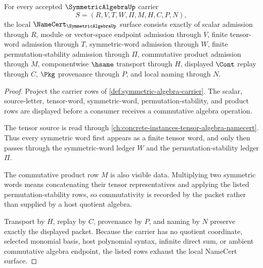 \begin{theorem}
\label{thm:symmetric-algebra-namecert-obligations}
For every accepted $\SymmetricAlgebraUp$ carrier
$$
S=(R,V,T,W,\Pi,M,H,C,P,N),
$$
the local $\NameCert_{\SymmetricAlgebraUp}$ surface consists exactly of scalar admission through $R$, module or vector-space endpoint admission through $V$, finite tensor-word admission through $T$, symmetric-word admission through $W$, finite permutation-stability admission through $\Pi$, commutative product admission through $M$, componentwise $\hsame$ transport through $H$, displayed $\Cont$ replay through $C$, $\Pkg$ provenance through $P$, and local naming through $N$.
\end{theorem}
\begin{proof}
Project the carrier rows of \autoref{def:symmetric-algebra-carrier}. The scalar, source-letter, tensor-word, symmetric-word, permutation-stability, and product rows are displayed before a consumer receives a commutative algebra operation.

The tensor source is read through \autoref{ch:concrete-instances-tensor-algebra-namecert}. Thus every symmetric word first appears as a finite tensor word, and only then passes through the symmetric-word ledger $W$ and the permutation-stability ledger $\Pi$.

The commutative product row $M$ is also visible data. Multiplying two symmetric words means concatenating their tensor representatives and applying the listed permutation-stability rows, so commutativity is recorded by the packet rather than supplied by a host quotient algebra.

Transport by $H$, replay by $C$, provenance by $P$, and naming by $N$ preserve exactly the displayed packet. Because the carrier has no quotient coordinate, selected monomial basis, host polynomial syntax, infinite direct sum, or ambient commutative algebra endpoint, the listed rows exhaust the local NameCert surface.
\end{proof}

